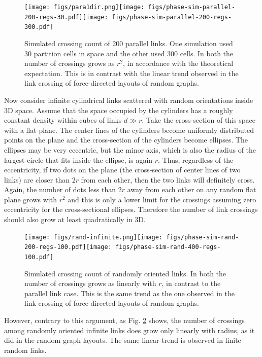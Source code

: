 \documentclass[nofootinbib,preprint,floatfix,titlepage,superscriptaddress]{revtex4} %
\begin{document}
\begin{figure}
    \centering
    \texttt{[image: figs/para1dir.png]}\texttt{[image: figs/phase-sim-parallel-200-regs-30.pdf]}\texttt{[image: figs/phase-sim-parallel-200-regs-300.pdf]}
    \caption{Simulated crossing count of 200 parallel links. One simulation used 30 partition cells in space and the other used 300 cells. In both the number of crossings grows as $r^2$, in accordance with the theoretical expectation. This is in contrast with the linear trend observed in the link crossing of force-directed layouts of random graphs.}
    \label{fig:simpara}
\end{figure}


Now consider infinite cylindrical links scattered with random orientations inside 3D space. Assume that the space occupied by the cylinders has a roughly constant density within cubes of links $d \gg r$. Take the cross-section of this space with a flat plane. The center lines of the cylinders become uniformly distributed points on the plane and the cross-section of the cylinders become ellipses. The ellipses may be very eccentric, but the minor axis, which is also the radius of the largest circle that fits inside the ellipse, is again $r$. Thus, regardless of the eccentricity, if two dots on the plane (the cross-section of center lines of two links) are closer than $2r$ from each other, then the two links will definitely cross. Again, the number of dots less than $2r$ away from each other on any random flat plane grows with $r^2$ and this is only a lower limit for the crossings assuming zero eccentricity for the cross-sectional ellipses.  Therefore the number of link crossings should also grow at least quadratically in 3D.

\begin{figure}
    \centering
    \texttt{[image: figs/rand-infinite.png]}\texttt{[image: figs/phase-sim-rand-200-regs-100.pdf]}\texttt{[image: figs/phase-sim-rand-400-regs-100.pdf]}
    \caption{Simulated crossing count of  randomly oriented links. In both the number of crossings grows as linearly with $r$, in contrast to the parallel link case. This is the same trend as the one observed in the link crossing of force-directed layouts of random graphs.}
    \label{fig:simrand}
\end{figure}

However, contrary to this argument, as Fig. \ref{fig:simrand} shows, the number of crossings among randomly oriented infinite links does grow only linearly with radius, as it did in the random graph layouts. The same linear trend is observed in finite random links.  
\end{document}
